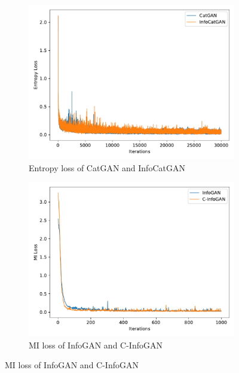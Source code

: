 \begin{figure}[htbp]
  \centering
  \begin{subfigure}[b]{\twof\textwidth}
    \includegraphics[width=\textwidth]{Img/icg-convergence.pdf}
    \caption{Entropy loss of CatGAN and InfoCatGAN}
    \label{ffig:icg-convergence}
  \end{subfigure}
  \begin{subfigure}[b]{\twof\textwidth}
    \includegraphics[width=\textwidth]{Img/cig-convergence.pdf}
    \caption{MI loss of InfoGAN and C-InfoGAN}
    \label{ffig:cig-convergence}
  \end{subfigure}
  \label{fig:convergence}
\end{figure}
